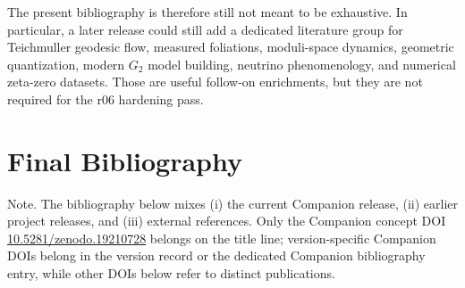 \noindent The present bibliography is therefore still not meant to be exhaustive. In particular, a later release could still add a dedicated literature group for Teichmuller geodesic flow, measured foliations, moduli-space dynamics, geometric quantization, modern $G_2$ model building, neutrino phenomenology, and numerical zeta-zero datasets. Those are useful follow-on enrichments, but they are not required for the r06 hardening pass.

\clearpage
\section*{Final Bibliography}

\noindent Note. The bibliography below mixes (i) the current Companion release, (ii) earlier project releases, and (iii) external references. Only the Companion concept DOI \href{https://doi.org/10.5281/zenodo.19210728}{10.5281/zenodo.19210728} belongs on the title line; version-specific Companion DOIs belong in the version record or the dedicated Companion bibliography entry, while other DOIs below refer to distinct publications.
